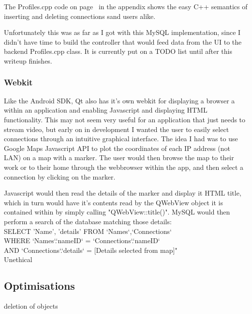 \documentclass[11pt]{article} %
\newcommand{\tab}{\hspace*{2em}}
\begin{document}
The Profiles.cpp code on page~\pageref{profiles} in the appendix shows the easy C++ semantics of inserting and deleting connections sand users alike.

Unfortunately this was as far as I got with this MySQL implementation, since I didn't have time to build the controller that would feed data from the UI to the backend Profiles.cpp class. It is currently put on a TODO list until after this writeup finishes.

\subsubsection{Webkit}
Like the Android SDK, Qt also has it's own webkit for displaying a browser a within an application and enabling Javascript and displaying HTML  functionality. This may not seem very useful for an application that just needs to stream video, but early on in development I wanted the user to easily select connections through an intuitive graphical interface.
The idea I had was to use Google Maps Javascript API to plot the coordinates of each IP address (not LAN) on a map with a marker. The user would then browse the map to their work or to their home through the webbrowser within the app, and then select a connection by clicking on the marker.

Javascript would then read the details of the marker and display it HTML title, which in turn would have it's contents read by the QWebView object it is contained within by simply calling "QWebView::title()". MySQL would then perform a search of the database matching those details:\\

 SELECT 'Name', 'details' FROM `Names`,`Connections`\\
\tab WHERE `Names`.`nameID` = `Connections`.`nameID`\\
\tab AND `Connections`.`details` = [Details selected from map]"\\






Unethical 

\subsection{Optimisations}
deletion of objects
\end{document}
